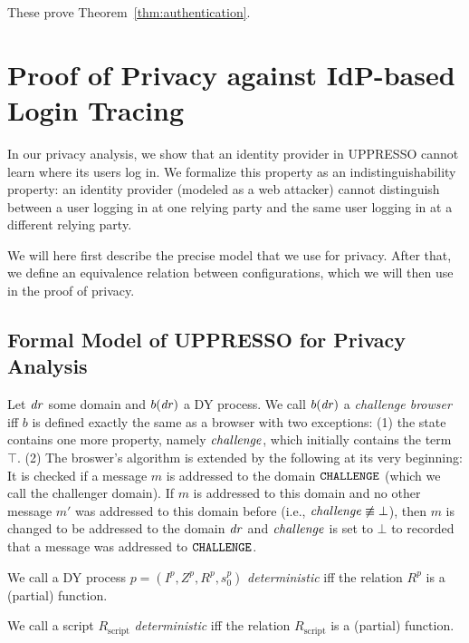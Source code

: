   These prove Theorem~\ref{thm:authentication}.\QED
  
  \section{Proof of Privacy against IdP-based Login Tracing}
  
  In our privacy analysis, we show that an identity provider in UPPRESSO cannot learn 
  where its users log in. We formalize this property as an indistinguishability 
  property: an identity provider (modeled as a web attacker) cannot distinguish 
  between a user logging in at one relying party and the same user logging in at 
  a different relying party.
  
  We will here first describe the precise model that we use for privacy.
  After that, we define an equivalence relation between configurations,
  which we will then use in the proof of privacy.
  
  \subsection{Formal Model of UPPRESSO for Privacy Analysis}
  
  \begin{definition}
    Let $\mathit{dr}$ some domain and $b(\mathit{dr})$ a DY process. 
    We call $b(\mathit{dr})$ a \emph{challenge browser} iff $b$
    is defined exactly the same as a browser with two exceptions: 
    (1) the state contains one more property, namely 
    $\mathit{challenge}$, which initially contains the term $\top$. 
    (2) The broswer's algorithm is extended by the following at 
    its very beginning: It is checked if a message $m$ is 
    addressed to the domain $\mathtt{CHALLENGE}$ (which we call the 
    challenger domain). If $m$ is addressed to this domain and 
    no other message $m'$ was addressed to this domain before 
    (i.e., $\mathit{challenge} \not\equiv \bot$), then $m$ is changed 
    to be addressed to the domain $\mathit{dr}$ and $\mathit{challenge}$ 
    is set to $\bot$ to recorded that a message was addressed to 
    $\mathtt{CHALLENGE}$.
  \end{definition}
  
  \begin{definition}
    We call a DY process $p = (I^p,Z^p,R^p,s_0^p)$ \emph{deterministic} iff 
    the relation $R^p$ is a (partial) function.
  
    We call a script $R_\text{script}$ \emph{deterministic} iff the relation 
    $R_\text{script}$ is a (partial) function.
  \end{definition}
  
